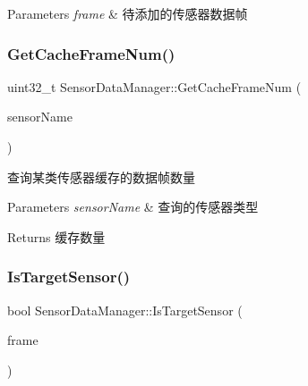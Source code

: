 \begin{DoxyParams}{Parameters}
{\em frame} & 待添加的传感器数据帧 \\
\hline
\end{DoxyParams}
\mbox{\label{classSensorDataManager_a6775031f1005a7be711ecc75686ee092}} 
\subsubsection{\texorpdfstring{Get\+Cache\+Frame\+Num()}{GetCacheFrameNum()}}
{\footnotesize\ttfamily uint32\+\_\+t Sensor\+Data\+Manager\+::\+Get\+Cache\+Frame\+Num (\begin{DoxyParamCaption}\item[{const Sensor\+Type}]{sensor\+Name }\end{DoxyParamCaption})}



查询某类传感器缓存的数据帧数量 


\begin{DoxyParams}{Parameters}
{\em sensor\+Name} & 查询的传感器类型 \\
\hline
\end{DoxyParams}
\begin{DoxyReturn}{Returns}
缓存数量 
\end{DoxyReturn}
\mbox{\label{classSensorDataManager_a90a06eeb7f654dcf4b8e2bc6cad34c39}} 
\subsubsection{\texorpdfstring{Is\+Target\+Sensor()}{IsTargetSensor()}}
{\footnotesize\ttfamily bool Sensor\+Data\+Manager\+::\+Is\+Target\+Sensor (\begin{DoxyParamCaption}\item[{const Sensor\+Frame \&}]{frame }\end{DoxyParamCaption})\hspace{0.3cm}{\ttfamily [private]}}



